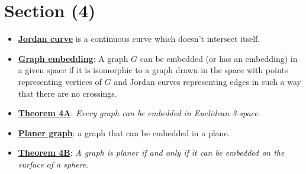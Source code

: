 \documentclass[12pt,a4paper, twocolumn]{article}
\begin{document}
\section*{Section (4)}
\begin{itemize}
		\item \underline{\textbf{Jordan curve}} is a continuous curve which doesn't intersect itself.
		\item \underline{\textbf{Graph embedding}}: A graph $G$ can be embedded (or has an embedding) in a given space if it is isomorphic to a graph drawn in the space with points representing vertices of $G$ and Jordan curves representing edges in such a way that there are no crossings.
		\item \underline{\textbf{Theorem 4A}}: \emph{Every graph can be embedded in Euclidean 3-space}.
		\item \underline{\textbf{Planer graph}}: a graph that can be embedded in a plane.
		\item \underline{\textbf{Theorem 4B}}: \emph{A graph is planer if and only if it can be embedded on the surface of a sphere}.
\end{itemize}
\end{document}
